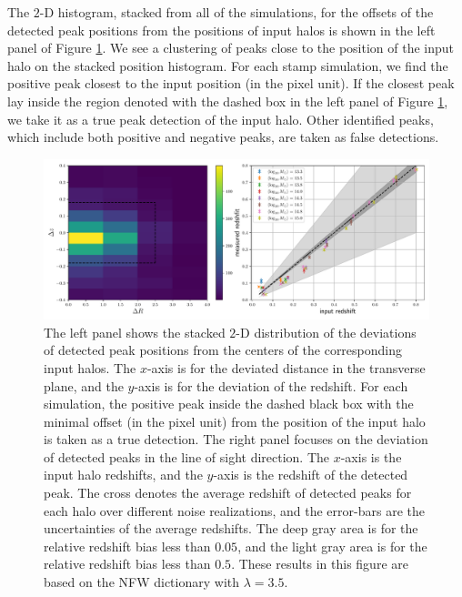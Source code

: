 The $2$-D histogram, stacked from all of the simulations, for the offsets of
the detected peak positions from the positions of input halos is shown in the
left panel of Figure \ref{fig_detoffsets}. We see a clustering of peaks close
to the position of the input halo on the stacked position histogram.  For each stamp
simulation, we find the positive peak closest to the input position (in the
pixel unit). If the closest peak lay inside the region denoted with the dashed
box in the left panel of Figure \ref{fig_detoffsets}, we take it as a true peak
detection of the input halo. Other identified peaks, which include both positive
and negative peaks, are taken as false detections.

\begin{figure}
 \centering
 \includegraphics[width=1.0\textwidth]{peak_scatters_NFW_lbd35.pdf}
 \caption{The left panel shows the stacked $2$-D distribution of the deviations
     of detected peak positions from the centers of the corresponding input
     halos. The $x$-axis is for the deviated distance in the transverse plane,
     and the $y$-axis is for the deviation of the redshift. For each
     simulation, the positive peak inside the dashed black box with the minimal
     offset (in the pixel unit) from the position of the input halo is taken as
     a true detection. The right panel focuses on the deviation of detected
     peaks in the line of sight direction. The $x$-axis is the input halo
     redshifts, and the $y$-axis is the redshift of the detected peak. The
     cross denotes the average redshift of detected peaks for each halo over
     different noise realizations, and the error-bars are the uncertainties of
     the average redshifts. The deep gray area is for the relative redshift
     bias less than $0.05$, and the light gray area is for the relative
     redshift bias less than $0.5$. These results in this figure are based on
     the NFW dictionary with $\lambda=3.5$.
     } \label{fig_detoffsets}
\end{figure}

